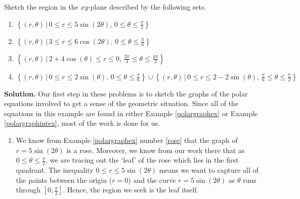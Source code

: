 \begin{ex} \label{polarregionex}  Sketch the region in the $xy$-plane described by the following sets.

\begin{enumerate}

\item  $\left\{ (r,\theta) \, | \, 0 \leq r \leq 5\sin(2\theta), \, 0 \leq \theta \leq \frac{\pi}{2} \right\}$

\item  $\left\{ (r,\theta) \, | \, 3 \leq r \leq 6 \cos(2\theta), \, 0 \leq \theta \leq \frac{\pi}{6} \right\}$

\item  $\left\{ (r,\theta) \, | \, 2+4\cos(\theta) \leq r \leq 0, \, \frac{2\pi}{3} \leq \theta \leq \frac{4\pi}{3} \right\}$

\item  $ \left\{ (r,\theta) \, | \, 0\leq r \leq 2\sin(\theta), \,  0 \leq \theta \leq \frac{\pi}{6} \right\} \cup \left\{ (r,\theta) \, | \, 0\leq r \leq 2-2\sin(\theta), \, \frac{\pi}{6} \leq \theta \leq \frac{\pi}{2} \right\}$

\end{enumerate}

{\bf Solution.}  Our first step in these problems is to sketch the graphs of the polar equations involved to get a sense of the geometric situation.  Since all of the equations in this example are found in either Example \ref{polargraphex} or Example \ref{polargraphintex}, most of the work is done for us.

\begin{enumerate}

\item  We know from Example \ref{polargraphex} number \ref{rose} that the graph of $r = 5\sin(2\theta)$ is a rose.  Moreover, we know from our work there that as  $0 \leq \theta \leq \frac{\pi}{2}$,  we are tracing out the `leaf' of the rose which lies in the first quadrant.  The inequality $0 \leq r \leq 5\sin(2\theta)$ means we want to capture all of the points between the origin ($r=0$) and the curve $r = 5\sin(2\theta)$ as $\theta$ runs through $\left[0, \frac{\pi}{2}\right]$.  Hence, the region we seek is the leaf itself.

\hspace{-.37in} \begin{tabular}{cc}


\end{tabular}
\end{enumerate}
\end{ex}
